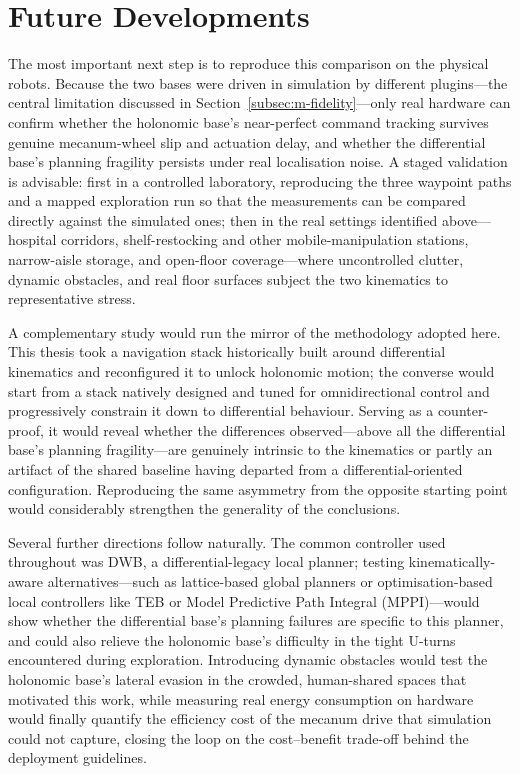 \section{Future Developments}
\label{sec:conclusions_future}

The most important next step is to reproduce this comparison on the physical robots. Because the
two bases were driven in simulation by different plugins---the central limitation discussed in
Section~\ref{subsec:m-fidelity}---only real hardware can confirm whether the holonomic base's
near-perfect command tracking survives genuine mecanum-wheel slip and actuation delay, and whether
the differential base's planning fragility persists under real localisation noise. A staged
validation is advisable: first in a controlled laboratory, reproducing the three waypoint paths and
a mapped exploration run so that the measurements can be compared directly against the simulated
ones; then in the real settings identified above---hospital corridors, shelf-restocking and other
mobile-manipulation stations, narrow-aisle storage, and open-floor coverage---where uncontrolled
clutter, dynamic obstacles, and real floor surfaces subject the two kinematics to representative
stress.

A complementary study would run the mirror of the methodology adopted here. This thesis took a
navigation stack historically built around differential kinematics and reconfigured it to unlock
holonomic motion; the converse would start from a stack natively
designed and tuned for omnidirectional control and progressively constrain it down to differential
behaviour. Serving as a counter-proof, it would reveal whether the differences observed---above all
the differential base's planning fragility---are genuinely intrinsic to the kinematics or partly an
artifact of the shared baseline having departed from a differential-oriented configuration.
Reproducing the same asymmetry from the opposite starting point would considerably strengthen the
generality of the conclusions.

Several further directions follow naturally. The common controller used throughout was DWB, a
differential-legacy local planner; testing kinematically-aware alternatives---such as lattice-based
global planners or optimisation-based local controllers like TEB or Model Predictive Path Integral (MPPI)---would show whether the
differential base's planning failures are specific to this planner, and could also relieve the
holonomic base's difficulty in the tight U-turns encountered during exploration. Introducing
dynamic obstacles would test the holonomic base's lateral evasion in the crowded, human-shared
spaces that motivated this work, while measuring real energy consumption on hardware would finally
quantify the efficiency cost of the mecanum drive that simulation could not capture, closing the
loop on the cost--benefit trade-off behind the deployment guidelines.

